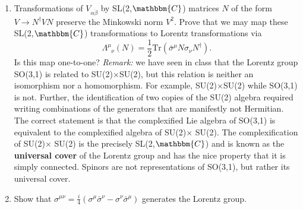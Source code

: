 \documentclass[12pt]{article}
\begin{document}
\begin{enumerate}
\begin{enumerate}
\item Transformations of $V_{\alpha\dot\beta}$ by SL(2,$\mathbbm{C}$) matrices $N$ of the form $V \to N^\dag V N$ preserve the Minkowski norm $V^2$. Prove that we may map these SL(2,$\mathbbm{C}$) transformations to Lorentz transformations via
$$\Lambda^\mu_{\phantom{\mu}\nu}(N) = \frac 12 \text{Tr} (\bar\sigma^\mu N\sigma_\nu N^\dag).$$
Is this map one-to-one? \textit{Remark:} we have seen in class that the Lorentz group SO(3,1) is related to SU(2)$\times$SU(2), but this relation is neither an isomorphism nor a homomorphism. For example, SU(2)$\times$SU(2) while SO(3,1) is not. Further, the identification of two copies of the SU(2) algebra required writing combinations of the generators that  are manifestly not Hermitian. The correct statement is that the complexified Lie algebra of SO(3,1) is equivalent to the complexified algebra of SU(2)$\times$ SU(2). The complexification of SU(2)$\times$ SU(2) is the precisely  SL(2,$\mathbbm{C}$) and is known as the \textbf{universal cover} of the Lorentz group and has the nice property that it is simply connected. Spinors are not representations of SO(3,1), but rather its universal cover.

\item Show that $\sigma^{\mu\nu} = \frac i4 (\sigma^\mu \bar\sigma^\nu - \sigma^\nu\bar\sigma^\mu)$ generates the Lorentz group.
\end{enumerate}


\end{enumerate}

 
\end{document}
